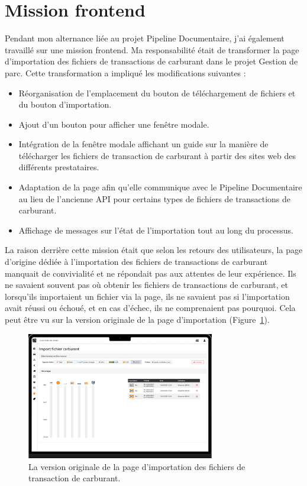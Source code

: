 \section{Mission frontend}

Pendant mon alternance liée au projet Pipeline Documentaire, j'ai également travaillé sur une mission frontend. Ma responsabilité était de transformer la page d'importation des fichiers de transactions de carburant dans le projet Gestion de parc. Cette transformation a impliqué les modifications suivantes :

\begin{itemize}
    \item Réorganisation de l'emplacement du bouton de téléchargement de fichiers et du bouton d'importation.
    \item Ajout d'un bouton pour afficher une fenêtre modale.
    \item Intégration de la fenêtre modale affichant un guide sur la manière de télécharger les fichiers de transaction de carburant à partir des sites web des différents prestataires.
    \item Adaptation de la page afin qu'elle communique avec le Pipeline Documentaire au lieu de l'ancienne API pour certains types de fichiers de transactions de carburant.
    \item Affichage de messages sur l'état de l'importation tout au long du processus.
\end{itemize}

La raison derrière cette mission était que selon les retours des utilisateurs, la page d'origine dédiée à l'importation des fichiers de transactions de carburant manquait de convivialité et ne répondait pas aux attentes de leur expérience. Ils ne savaient souvent pas où obtenir les fichiers de transactions de carburant, et lorsqu'ils importaient un fichier via la page, ils ne savaient pas si l'importation avait réussi ou échoué, et en cas d'échec, ils ne comprenaient pas pourquoi. Cela peut être vu sur la version originale de la page d'importation (Figure~\ref{fig:original-import-page}).

\begin{figure}[ht]
    \centering
    \includegraphics[width=0.73\textwidth]{img/frontend-maquettage-original}
    \caption{La version originale de la page d'importation des fichiers de transaction de carburant.}
    \label{fig:original-import-page}
\end{figure}

